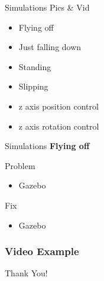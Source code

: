 \documentclass{beamer}
\begin{document}
\begin{frame}{Simulations}
Pics \& Vid
\begin{itemize}
    \item Flying off
    \item Just falling down
    \item Standing
    \item Slipping
    \item z axis position control
    \item z axis rotation control
\end{itemize}
\end{frame}

\begin{frame}{Simulations}
\textbf{Flying off}

\begin{block}{Problem}
    \begin{itemize}
        \item Gazebo
    \end{itemize}
\end{block}

\begin{block}{Fix}
    \begin{itemize}
        \item Gazebo
    \end{itemize}
\end{block}

\end{frame}

\begin{frame}
    \frametitle{Video Example}
\end{frame}

\begin{frame}
	\LARGE{Thank You!}
\end{frame}\normalfont
\end{document}
